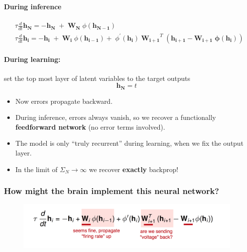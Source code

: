 \documentclass[main]{subfiles}
\begin{document}
\paragraph{During inference}
\begin{equation*}
    \begin{split}
        & \tau \frac{d}{dt} \bm{h_N} = - \bm{h_N} \; + \; \bm{W_N}\; \phi(\bm{h_{N-1}})\\
        & \tau \frac{d}{dt} \bm{h_i} = - \bm{h_i} \; + \; \bm{W_i}\; \phi(\bm{h_{i-1}}) + \; \phi^\prime (\bm{h_{i}}) \; \bm{W_{i+1}}^T \;  (\bm{h_{i+1} - \bm{W_{i+1}} \; \phi(\bm{h_{i}})})
    \end{split}
\end{equation*}
\paragraph{During learning:} set the top most layer of latent variables to the target outputs
\begin{equation}
    \bm{h_N} = t
\end{equation}
\begin{itemize}
    \item Now errors propagate backward.
    \item During inference, errors always vanish, so we recover a functionally
\textbf{feedforward network} (no error terms involved).
    \item The model is only “truly recurrent” during learning, when we fix the output layer.
    \item In the limit of $\Sigma_N \rightarrow \infty$  we recover \textbf{exactly} backprop!
\end{itemize}


\subsubsection{How might the brain implement this neural network?}
\begin{figure}[H]
        \centering
        \includegraphics[width=0.8\linewidth]{06_PredictionErrorsDuringPerceptionAndLearning/figures/network_equation_brain.png}
        \label{fig:autoencoder}
\end{figure}
\end{document}
